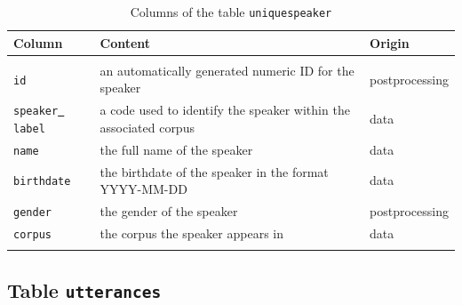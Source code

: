 \documentclass[a4paper, 11pt]{book}
\newcommand{\und}{\underline{{ }}\hspace{0.2mm}}	%
\begin{document}
\begin{longtable}{lp{.5\linewidth}p{.2\linewidth}}
	\toprule
		\textbf{Column} & \textbf{Content} 	& \textbf{Origin} \\
	\midrule
	\endhead
	
	\bottomrule\\[-0.15cm]
	\caption{Columns of the table \texttt{uniquespeaker}}
	\endfoot
	
		\texttt{id} 		& an automatically generated numeric ID for the speaker & postprocessing \\
		\texttt{speaker\und label} & a code used to identify the speaker within the associated corpus & data \\
		\texttt{name}		& the full name of the speaker & data \\
		\texttt{birthdate} 	& the birthdate of the speaker in the format YYYY-MM-DD & data \\ 
		\texttt{gender} 	& the gender of the speaker & postprocessing \\
		\texttt{corpus} 	& the corpus the speaker appears in & data \\ [-0.3cm]
	\label{tab:Table uniquespeakers}
\end{longtable}


\subsection{Table \texttt{utterances}}
\label{subsec:Table utterances}
\end{document}
